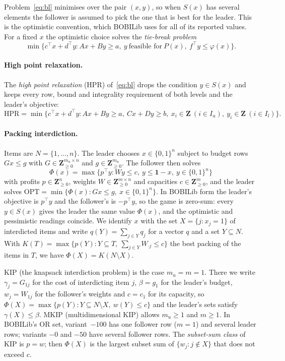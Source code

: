 Problem~\eqref{eq:bl} minimises over the pair $(x,y)$, so when $S(x)$ has
several elements the follower is assumed to pick the one that is best for the
leader. This is the optimistic convention, which BOBILib uses for all of its
reported values. For a fixed $x$ the optimistic choice solves the
\emph{tie-break problem}
\[
  \min\bigl\{c^{\top}x+d^{\top}y : Ax+By\ge a,\ y\ \text{feasible for}\ P(x),\ f^{\top}y\le\varphi(x)\bigr\}.
\]

\paragraph{High point relaxation.}
The \emph{high point relaxation} (HPR) of~\eqref{eq:bl} drops the condition
$y\in S(x)$ and keeps every row, bound and integrality requirement of both
levels and the leader's objective:
\[
  \mathrm{HPR}=\min\bigl\{c^{\top}x+d^{\top}y : Ax+By\ge a,\ Cx+Dy\ge b,\
  x_i\in\mathbf{Z}\ (i\in I_u),\ y_i\in\mathbf{Z}\ (i\in I_l)\bigr\}.
\]

\paragraph{Packing interdiction.}
Items are $N=\{1,\dots,n\}$. The leader chooses $x\in\{0,1\}^n$ subject to
budget rows $Gx\le g$ with $G\in\mathbf{Z}_{\ge 0}^{m_u\times n}$ and
$g\in\mathbf{Z}_{\ge 0}^{m_u}$. The follower then solves
\[
  \Phi(x)=\max\bigl\{p^{\top}y : Wy\le c,\ y\le \mathbf{1}-x,\ y\in\{0,1\}^n\bigr\}
\]
with profits $p\in\mathbf{Z}_{\ge 0}^n$, weights $W\in\mathbf{Z}_{\ge 0}^{m\times n}$
and capacities $c\in\mathbf{Z}_{\ge 0}^m$, and the leader solves
$\mathrm{OPT}=\min\{\Phi(x) : Gx\le g,\ x\in\{0,1\}^n\}$. In BOBILib form the
leader's objective is $p^{\top}y$ and the follower's is $-p^{\top}y$, so the
game is zero-sum: every $y\in S(x)$ gives the leader the same value $\Phi(x)$,
and the optimistic and pessimistic readings coincide. We identify $x$ with the
set $X=\{j : x_j=1\}$ of interdicted items and write $q(Y)=\sum_{j\in Y}q_j$ for
a vector $q$ and a set $Y\subseteq N$. With
$K(T)=\max\{p(Y): Y\subseteq T,\ \sum_{j\in Y}W_{\cdot j}\le c\}$ the best packing
of the items in $T$, we have $\Phi(X)=K(N\setminus X)$.

KIP (the knapsack interdiction problem) is the case $m_u=m=1$. There we write
$\gamma_j=G_{1j}$ for the cost of interdicting item $j$, $\beta=g_1$ for the
leader's budget, $w_j=W_{1j}$ for the follower's weights and $c=c_1$ for its
capacity, so
$\Phi(X)=\max\{p(Y): Y\subseteq N\setminus X,\ w(Y)\le c\}$ and the leader's sets
satisfy $\gamma(X)\le\beta$. MKIP (multidimensional KIP) allows $m_u\ge1$ and
$m\ge1$. In BOBILib's OR set, variant~$-100$ has one follower row ($m=1$) and
several leader rows; variants $-0$ and $-50$ have several follower rows. The
\emph{subset-sum class} of KIP is $p=w$; then $\Phi(X)$ is the largest subset
sum of $\{w_j: j\notin X\}$ that does not exceed $c$.

